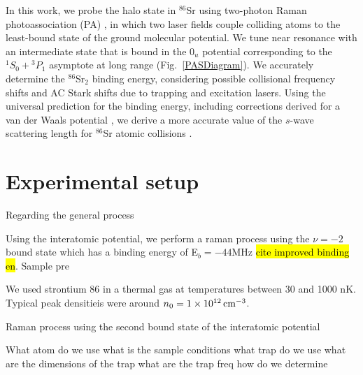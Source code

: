 In this work, we probe the halo state in $^{86}$Sr using two-photon Raman photoassociation (PA) \cite{jtl06}, in which two laser fields couple colliding atoms to the least-bound state of the ground molecular potential. We tune near resonance with an intermediate state that is bound in the $0_u$ potential  corresponding to the $^1S_0+ {^3P_1}$ asymptote at long range \cite{mmp08} (Fig.\ \ref{PASDiagram}). We accurately determine the $^{86}$Sr$_2$ binding energy, considering possible collisional frequency shifts and AC Stark shifts due to trapping and excitation lasers. Using the universal prediction for the binding energy, including corrections derived for a van der Waals potential \cite{gfl93,gao01,gao04}, we derive a more accurate value of the $s$-wave scattering length for $^{86}$Sr atomic collisions \cite{skt10,mmp08}.




\section{Experimental setup}
\label{sec:lowE_setup}

Regarding the general process 

Using the \intPot{\gs}{\ex} interatomic potential, we perform a raman process using the $\nu=-2$ bound state which has a binding energy of E$_b=-44 \text{MHz}$ \hl{cite improved binding en}. Sample pre 

We used strontium 86 in a thermal gas at temperatures between 30 and 1000 nK. Typical peak densitieis were around $n_0 = 1 \times 10^{12} \, \text{cm}^{-3}$. 

Raman process using the second bound state of the \intPot{\gs}{\ex} interatomic potential

What atom do we use
what is the sample conditions
what trap do we use
what are the dimensions of the trap
what are the trap freq
how do we determine 

